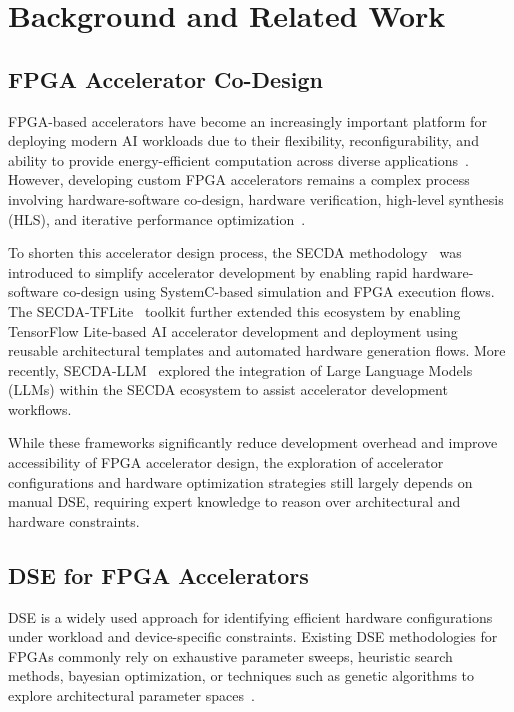 
\section{Background and Related Work}
\label{background}

\subsection{FPGA Accelerator Co-Design}

FPGA-based accelerators have become an increasingly important platform for deploying modern AI workloads due to their flexibility, reconfigurability, and ability to provide energy-efficient computation across diverse applications~\cite{jiang2025fpga}. However, developing custom FPGA accelerators remains a complex process involving hardware-software co-design, hardware verification, high-level synthesis (HLS), and iterative performance optimization~\cite{gibsonDLAS2025}.

To shorten this accelerator design process, the SECDA methodology~\cite{haris2021secda} was introduced to simplify accelerator development by enabling rapid hardware-software co-design using SystemC-based simulation and FPGA execution flows. 
The SECDA-TFLite~\cite{haris2023secda} toolkit further extended this ecosystem by enabling TensorFlow Lite-based AI accelerator development and deployment using reusable architectural templates and automated hardware generation flows. More recently, SECDA-LLM~\cite{haris2024designing} explored the integration of Large Language Models (LLMs) within the SECDA ecosystem to assist accelerator development workflows.

While these frameworks significantly reduce development overhead and improve accessibility of FPGA accelerator design, the exploration of accelerator configurations and hardware optimization strategies still largely depends on manual DSE, requiring expert knowledge to reason over architectural and hardware constraints.



\subsection{DSE for FPGA Accelerators}

DSE is a widely used approach for identifying efficient hardware configurations under workload and device-specific constraints. Existing DSE methodologies for FPGAs commonly rely on exhaustive parameter sweeps, heuristic search methods, bayesian optimization, or techniques such as genetic algorithms to explore architectural parameter spaces~\cite{saeedi2024survey,biscontini2024machine}.

